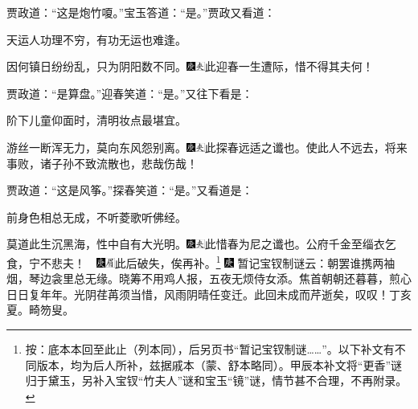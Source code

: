 贾政道：“这是炮竹嗄。”宝玉答道：“是。”贾政又看道：

天运人功理不穷，有功无运也难逢。

因何镇日纷纷乱，只为阴阳数不同。{\includegraphics[width=3mm]{../Images/00004}\includegraphics[width=3mm]{../Images/00012}\footnotesize \kaishu 此迎春一生遭际，惜不得其夫何！}

贾政道：“是算盘。”迎春笑道：“是。”又往下看是：

阶下儿童仰面时，清明妆点最堪宜。

游丝一断浑无力，莫向东风怨别离。{\includegraphics[width=3mm]{../Images/00004}\includegraphics[width=3mm]{../Images/00012}\footnotesize \kaishu 此探春远适之谶也。使此人不远去，将来事败，诸子孙不致流散也，悲哉伤哉！}

贾政道：“这是风筝。”探春笑道：“是。”又看道是：

前身色相总无成，不听菱歌听佛经。

莫道此生沉黑海，性中自有大光明。{\includegraphics[width=3mm]{../Images/00004}\includegraphics[width=3mm]{../Images/00012}\footnotesize \kaishu 此惜春为尼之谶也。公府千金至缁衣乞食，宁不悲夫！　{\includegraphics[width=3mm]{../Images/00004}\includegraphics[width=3mm]{../Images/00010}\footnotesize \kaishu 此后破失，俟再补。}}\footnote{按：底本本回至此止（列本同），后另页书“暂记宝钗制谜\ldots{}\ldots{}”。以下补文有不同版本，均为后人所补，兹据戚本（蒙、舒本略同）。甲辰本补文将“更香”谜归于黛玉，另补入宝钗“竹夫人”谜和宝玉“镜”谜，情节甚不合理，不再附录。}
{\includegraphics[width=3mm]{../Images/00004}  \kaishu 暂记宝钗制谜云：朝罢谁携两袖烟，琴边衾里总无缘。晓筹不用鸡人报，五夜无烦侍女添。焦首朝朝还暮暮，煎心日日复年年。光阴荏苒须当惜，风雨阴晴任变迁。此回未成而芹逝矣，叹叹！丁亥夏。畸笏叟。}

